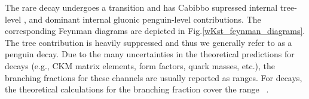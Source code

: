 


The rare decay \BzToOmeKstz undergoes a \DsEqOne transition and has Cabibbo supressed internal tree-level \bsuu, and dominant internal gluonic penguin-level \bsdd contributions. The corresponding Feynman diagrams are depicted in Fig.\ref{wKst_feynman_diagrams}. The tree contribution is heavily suppressed and thus we generally refer to \BzToOmeKstz as a \bsdd penguin decay. Due to the many uncertainties in the theoretical predictions for \Bvv decays (e.g., CKM matrix elements, form factors, quark masses, etc.), the branching fractions for these channels are usually reported as ranges. For \BzToOmeKstz decays, the theoretical calculations for the branching fraction cover the range \TheoryBrRange~\cite{ThPred: Ali Kramer, ThPred: Chen, ThPred: Cheng Yang, ThPred: Zou Xiao, ThPred: Beneke Rohrer Yang, Cheng Yang BR and Polarization in Bvv decays}. 


